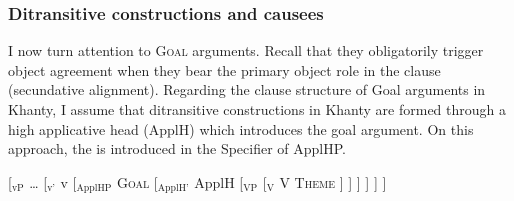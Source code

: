 \documentclass[output=paper
,modfonts
,nonflat]{langsci/langscibook}
\begin{document}
\subsubsection{Ditransitive constructions and causees}

I now turn attention to \textsc{Goal} arguments. Recall that they obligatorily trigger object agreement when they bear the primary object role in the clause (secundative alignment). 
Regarding the clause structure of Goal arguments in Khanty, I assume that ditransitive constructions in Khanty are formed through a high applicative head (ApplH) \citep{pylkkanen2008} which introduces the goal argument.
On this approach, the \goal{} is introduced in the Specifier of ApplHP. 


\begin{exe}
\ex \label{tree:highappl}
 { [$_{\textrm{vP}}$ {\ldots} [$_{\textrm{v'}}$ v [$_{\textrm{ApplHP}}$ \textsc{Goal} [$_{\textrm{ApplH'}}$ ApplH [$_{\textrm{VP}}$ {} [$_{\textrm{V}}$ V \textsc{Theme}  ] ] ] ] ] ]}

\end{exe}
\end{document}
